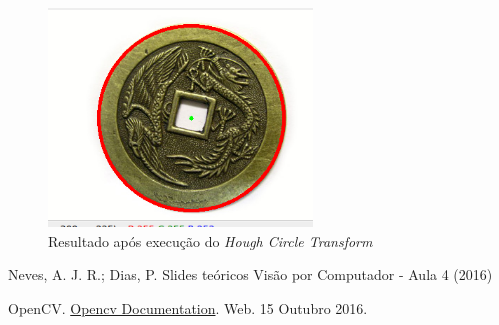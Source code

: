 \documentclass[portuguese, times, mirror]{revdetua}
\begin{document}
\begin{itemize}
\begin{figure}[ht!]
\centering
\includegraphics[width=70mm]{img/ex6_2.png}
\caption{Resultado após execução do \textit{Hough Circle Transform}}
\end{figure}

\end{itemize}





\begin{thebibliography}{1} %



Neves, A. J. R.; Dias, P. Slides teóricos Visão por Computador - Aula 4 (2016)


OpenCV. \href{hhttp://docs.opencv.org/}{Opencv Documentation}. Web. 15 Outubro 2016. 




\end{thebibliography}
\end{document}

